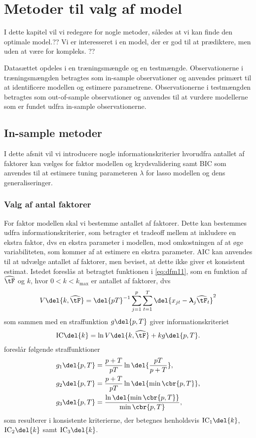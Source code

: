 \chapter{Metoder til valg af model}
I dette kapitel vil vi redegøre for nogle metoder, således at vi kan finde den optimale model.??
Vi er interesseret i en model, der er god til at prædiktere, men uden at være for kompleks.  ??

Datasættet opdeles i en træningsmængde og en testmængde. 
Observationerne i træningsmængden betragtes som in-sample observationer og anvendes primært til at identificere modellen og estimere parametrene. 
Observationerne i testmængden betragtes som out-of-sample observationer og anvendes til at vurdere modellerne som er fundet udfra in-sample observationerne. 
 
\section{In-sample metoder}
I dette afsnit vil vi introducere nogle informationskriterier hvorudfra antallet af faktorer kan vælges for faktor modellen og krydsvalidering samt BIC som anvendes til at estimere tuning parameteren \(\lambda\) for lasso modellen og dens generaliseringer.

\subsection{Valg af antal faktorer}
For faktor modellen skal vi bestemme antallet af faktorer.
Dette kan bestemmes udfra informationskriterier, som betragter et tradeoff mellem at inkludere en ekstra faktor, dvs en ekstra parameter i modellen, mod omkostningen af at øge variabiliteten, som kommer af at estimere en ekstra parameter.
AIC kan anvendes til at udvælge antallet af faktorer, men \citep{Bai_Ng} beviset, at dette ikke giver et konsistent estimat.
Istedet foreslås at betragtet funktionen i \eqref{eq:dfm11}, som en funktion af \(\widehat{\tF}\) og \(k\), hvor \(0<k<k_\text{max}\) er antallet af faktorer, dvs
\begin{align*}
V \del{k, \widehat{\tF}} = \del{p T}^{-1} \sum_{j=1}^p \sum_{t=1}^{T} \del{x_{jt} -\boldsymbol{\lambda}_j \widehat{\tF}_t}^2
\end{align*}
som sammen med en straffunktion \(g \del{p,T}\) giver informationskriteriet
\begin{align*}
\text{IC} \del{k} = \ln V \del{k, \widehat{\tF}} + k g \del{p,T}.
\end{align*}
\citep{Bai_Ng} foreslår følgende straffunktioner
\begin{align}
g_1 \del{p,T} &= \frac{p + T}{p T} \ln \del{\frac{p T}{p + T}}, \label{eq:ic1} \\
g_2 \del{p,T} &= \frac{p + T}{p T} \ln \del{ \min \cbr{p, T}}, \label{eq:ic2} \\
g_3 \del{p,T} &= \frac{\ln \del{\min \cbr{p, T}}}{\min \cbr{p, T}},\label{eq:ic3}
\end{align}
som resulterer i konsistente kriterierne, der betegnes henholdsvis \(\text{IC}_1 \del{k}\), \(\text{IC}_2 \del{k}\) samt \(\text{IC}_3 \del{k}\).

